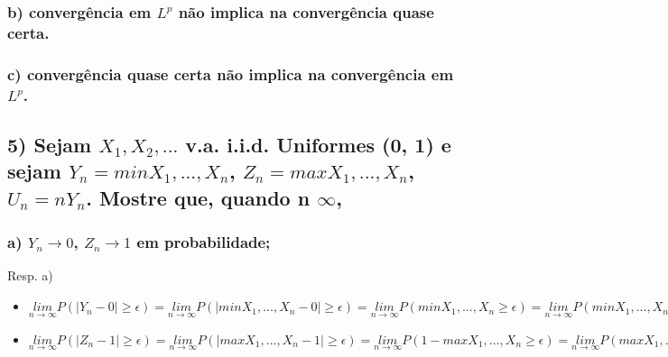 \documentclass[english]{article}
\begin{document}
\subsubsection*{\textmd{b) convergência em $L^{p}$ não implica na convergência quase
certa.}}


\subsubsection*{\textmd{c) convergência quase certa não implica na convergência em
$L^{p}$.}}


\subsection*{\textcompwordmark{}}


\subsection*{\textmd{5) Sejam $X_{1},X_{2},...$ v.a. i.i.d. Uniformes (0, 1)
e sejam $Y_{n}=min{X_{1},...,X_{n}}$, $Z_{n}=max{X_{1},...,X_{n}}$,
$U_{n}=nY_{n}$. Mostre que, quando n \textrightarrow{} \ensuremath{\infty},}}


\subsubsection*{\textmd{a) $Y_{n}\rightarrow0$, $Z_{n}\rightarrow1$ em probabilidade;}}

Resp. a)
\begin{itemize}
\item $\underset{n\rightarrow\infty}{lim}P(\left|Y_{n}-0\right|\ge\epsilon)=\underset{n\rightarrow\infty}{lim}P(\left|min{X_{1},...,X_{n}}-0\right|\ge\epsilon)=\underset{n\rightarrow\infty}{lim}P(min{X_{1},...,X_{n}}\ge\epsilon)=\underset{n\rightarrow\infty}{lim}P(min{X_{1},...,X_{n}}\ge\epsilon)\overset{ind.}{=}\underset{n\rightarrow\infty}{lim}(P(X\ge\epsilon))^{n}=\underset{n\rightarrow\infty}{lim}(1-\epsilon)^{n}=0$
\item $\underset{n\rightarrow\infty}{lim}P(\left|Z_{n}-1\right|\ge\epsilon)=\underset{n\rightarrow\infty}{lim}P(\left|max{X_{1},...,X_{n}}-1\right|\ge\epsilon)=\underset{n\rightarrow\infty}{lim}P(1-max{X_{1},...,X_{n}}\ge\epsilon)=\underset{n\rightarrow\infty}{lim}P(max{X_{1},...,X_{n}}\le1-\epsilon)\overset{ind.}{=}\underset{n\rightarrow\infty}{lim}P(X_{1}\le1-\epsilon)^{n}=\underset{n\rightarrow\infty}{lim}(1-\epsilon)^{n}=0$
\end{itemize}
\end{document}
